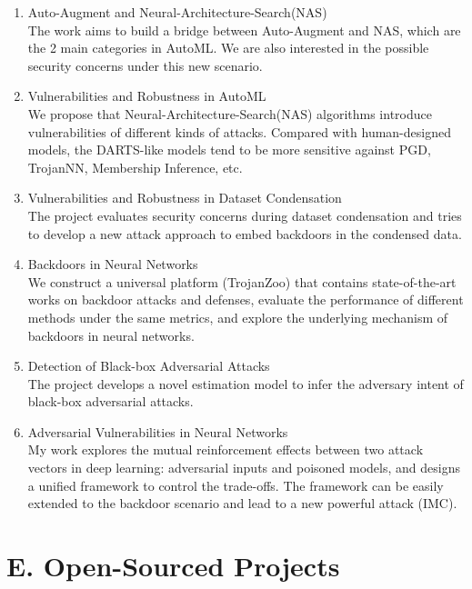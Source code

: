 \documentclass{resume}
\begin{document}
\begin{resume}
\begin{enumerate}[labelsep=15pt, parsep=8pt]

\item Auto-Augment and Neural-Architecture-Search(NAS)\\
The work aims to build a bridge between Auto-Augment and NAS, which are the 2 main categories in AutoML. We are also interested in the possible security concerns under this new scenario.

\item Vulnerabilities and Robustness in AutoML\\
We propose that Neural-Architecture-Search(NAS) algorithms introduce vulnerabilities of different kinds of attacks. Compared with human-designed models, the DARTS-like models tend to be more sensitive against PGD, TrojanNN, Membership Inference, etc.

\item Vulnerabilities and Robustness in Dataset Condensation\\
The project evaluates security concerns during dataset condensation and tries to develop a new attack approach to embed backdoors in the condensed data. 

\item Backdoors in Neural Networks\\
We construct a universal platform (TrojanZoo) that contains state-of-the-art works on backdoor attacks and defenses, evaluate the performance of different methods under the same metrics, and explore the underlying mechanism of backdoors in neural networks.

\item Detection of Black-box Adversarial Attacks\\
The project develops a novel estimation model to infer the adversary intent of black-box adversarial attacks.

\item Adversarial Vulnerabilities in Neural Networks\\
My work explores the mutual reinforcement effects between two attack vectors in deep learning: adversarial inputs and poisoned models, and designs a unified framework to control the trade-offs. The framework can be easily extended to the backdoor scenario and lead to a new powerful attack (IMC).

\end{enumerate}

\section{E. Open-Sourced Projects}
\vspace{8pt}


\end{resume}
\end{document}
